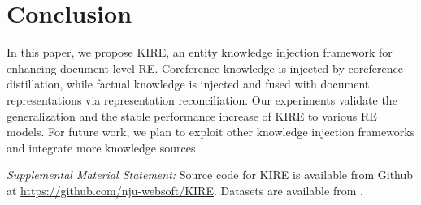 \documentclass[runningheads]{llncs}
\begin{document}
\section{Conclusion}
\label{sect:concl}

In this paper, we propose KIRE, an entity knowledge injection framework for enhancing document-level RE.
Coreference knowledge is injected by coreference distillation, while factual knowledge is injected and fused with document representations via representation reconciliation.
Our experiments validate the generalization and the stable performance increase of KIRE to various RE models.
For future work, we plan to exploit other knowledge injection frameworks and integrate more knowledge sources.

\medskip
\noindent\textit{Supplemental Material Statement:} Source code for KIRE is available from Github at \url{https://github.com/nju-websoft/KIRE}.
Datasets are available from \cite{yao2019docred,zaporojets2021dwie}.


\end{document}
